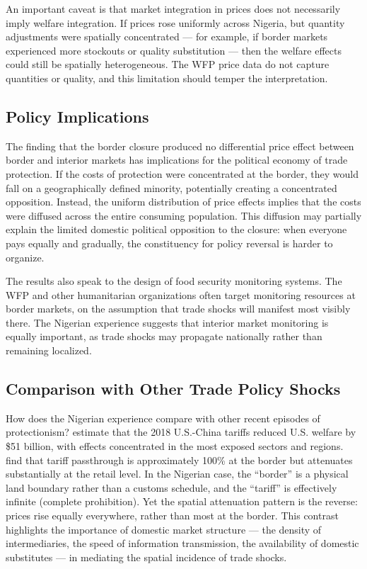 \documentclass[12pt]{article}
\begin{document}
An important caveat is that market integration in prices does not necessarily imply welfare integration. If prices rose uniformly across Nigeria, but quantity adjustments were spatially concentrated --- for example, if border markets experienced more stockouts or quality substitution --- then the welfare effects could still be spatially heterogeneous. The WFP price data do not capture quantities or quality, and this limitation should temper the interpretation.

\subsection{Policy Implications}

The finding that the border closure produced no differential price effect between border and interior markets has implications for the political economy of trade protection. If the costs of protection were concentrated at the border, they would fall on a geographically defined minority, potentially creating a concentrated opposition. Instead, the uniform distribution of price effects implies that the costs were diffused across the entire consuming population. This diffusion may partially explain the limited domestic political opposition to the closure: when everyone pays equally and gradually, the constituency for policy reversal is harder to organize.

The results also speak to the design of food security monitoring systems. The WFP and other humanitarian organizations often target monitoring resources at border markets, on the assumption that trade shocks will manifest most visibly there. The Nigerian experience suggests that interior market monitoring is equally important, as trade shocks may propagate nationally rather than remaining localized.

\subsection{Comparison with Other Trade Policy Shocks}

How does the Nigerian experience compare with other recent episodes of protectionism? \citet{fajgelbaum2020return} estimate that the 2018 U.S.-China tariffs reduced U.S. welfare by \$51 billion, with effects concentrated in the most exposed sectors and regions. \citet{cavallo2021tariff} find that tariff passthrough is approximately 100\% at the border but attenuates substantially at the retail level. In the Nigerian case, the ``border'' is a physical land boundary rather than a customs schedule, and the ``tariff'' is effectively infinite (complete prohibition). Yet the spatial attenuation pattern is the reverse: prices rise equally everywhere, rather than most at the border. This contrast highlights the importance of domestic market structure --- the density of intermediaries, the speed of information transmission, the availability of domestic substitutes --- in mediating the spatial incidence of trade shocks.
\end{document}
